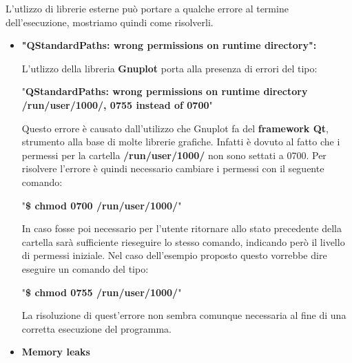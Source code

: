 \documentclass{article}
\begin{document}
L'utlizzo di librerie esterne può portare a qualche errore al termine 
dell'esecuzione, mostriamo quindi come risolverli. 
\begin{itemize}
    
    \bigskip
    \item \large\textbf{"QStandardPaths: wrong permissions on runtime 
    directory":} 

\smallskip
    \normalsize
    L'utlizzo della libreria \textbf{Gnuplot} porta alla presenza di errori del 
    tipo: 
    
    \medskip
    "\textbf{QStandardPaths: wrong permissions on runtime directory 
    /run/user/1000/, 0755 instead of 0700}"

    Questo errore è causato dall'utilizzo che Gnuplot fa del 
    \textbf{framework Qt}, strumento alla base di molte librerie grafiche. 
    Infatti è dovuto al fatto che i permessi per la cartella 
    \textbf{/run/user/1000/} non sono settati a 0700.
    Per risolvere l'errore è quindi necessario cambiare i permessi con il 
    seguente comando:

     \medskip
     "\textbf{\$ chmod 0700 /run/user/1000/}"

    \smallskip
     In caso fosse poi necessario per l'utente ritornare allo stato precedente 
     della cartella sarà sufficiente rieseguire lo stesso comando, indicando 
     però il livello di permessi iniziale. Nel caso dell'esempio proposto questo
      vorrebbe dire eseguire un comando del tipo:

     \medskip
     "\textbf{\$ chmod 0755 /run/user/1000/}"

     \smallskip

     La risoluzione di quest'errore non sembra comunque necessaria al fine di 
     una corretta esecuzione del programma.

    \bigskip\smallskip
    \item \large\:\textbf{Memory leaks} \normalsize



\end{itemize}
\end{document}
